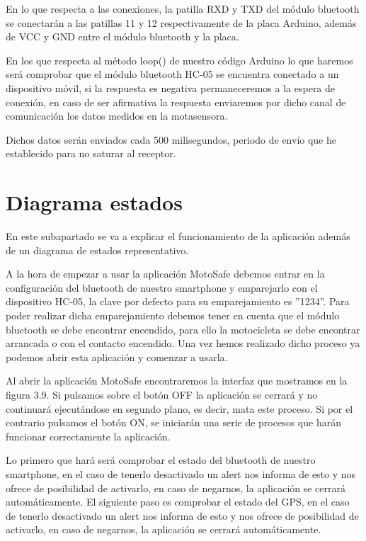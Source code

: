 			En lo que respecta a las conexiones, la patilla RXD y TXD del módulo bluetooth se conectarán a las patillas 11 y 12 respectivamente de la placa Arduino, además de VCC y GND entre el módulo bluetooth y la placa.
			
			En los que respecta al método loop() de nuestro código Arduino lo que haremos será comprobar que el módulo bluetooth HC-05 se encuentra conectado a un dispositivo móvil, si la respuesta es negativa permaneceremos a la espera de conexión, en caso de ser afirmativa la respuesta enviaremos por dicho canal de comunicación los datos medidos en la motasensora.
			
			Dichos datos serán enviados cada 500 milisegundos, periodo de envío que he establecido para no saturar al receptor.
			
			
			
			
	\section{Diagrama estados}
	
		En este subapartado se va a explicar el funcionamiento de la aplicación además de un diagrama de estados representativo.
		
		A la hora de empezar a usar la aplicación MotoSafe debemos entrar en la configuración del bluetooth de nuestro smartphone y emparejarlo con el dispositivo HC-05, la clave por defecto para su emparejamiento es ''1234''. Para poder realizar dicha emparejamiento debemos tener en cuenta que el módulo bluetooth se debe encontrar encendido, para ello la motocicleta se debe encontrar arrancada o con el contacto encendido. Una vez hemos realizado dicho proceso ya podemos abrir esta aplicación y comenzar a usarla.
		
		Al abrir la aplicación MotoSafe encontraremos la interfaz que mostramos en la figura 3.9. Si pulsamos sobre el botón OFF la aplicación se cerrará y no continuará ejecutándose en segundo plano, es decir, mata este proceso. Si por el contrario pulsamos el botón ON, se iniciarán una serie de procesos que harán funcionar correctamente la aplicación.
		
		Lo primero que hará será comprobar el estado del bluetooth de nuestro smartphone, en el caso de tenerlo desactivado un alert nos informa de esto y nos ofrece de posibilidad de activarlo, en caso de negarnos, la aplicación se cerrará automáticamente. El siguiente paso es comprobar el estado del GPS, en el caso de tenerlo desactivado un alert nos informa de esto y nos ofrece de posibilidad de activarlo, en caso de negarnos, la aplicación se cerrará automáticamente.
		
